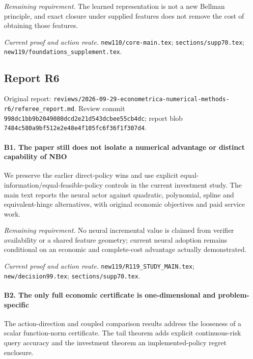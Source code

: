 \par\emph{Remaining requirement.} The learned representation is not a new Bellman principle, and exact closure under supplied features does not remove the cost of obtaining those features.

\par\emph{Current proof and action route.} \nolinkurl{new110/core-main.tex}; \nolinkurl{sections/supp70.tex}; \nolinkurl{new119/foundations_supplement.tex}.

\subsection{Report R6}

Original report: \nolinkurl{reviews/2026-09-29-econometrica-numerical-methods-r6/referee_report.md}. Review commit \nolinkurl{998dc1bb9b2049080dcd2e21d543dcbee55cb4dc}; report blob \nolinkurl{7484c580a9bf512e2e48e4f105fc6f36f1f307d4}.

\paragraph{B1. The paper still does not isolate a numerical advantage or distinct capability of NBO}

We preserve the earlier direct-policy wins and use explicit equal-information/\allowbreak{}equal-feasible-policy controls in the current investment study. The main text reports the neural actor against quadratic, polynomial, spline and equivalent-hinge alternatives, with original economic objectives and paid service work.

\par\emph{Remaining requirement.} No neural incremental value is claimed from verifier availability or a shared feature geometry; current neural adoption remains conditional on an economic and complete-cost advantage actually demonstrated.

\par\emph{Current proof and action route.} \nolinkurl{new119/R119_STUDY_MAIN.tex}; \nolinkurl{new/decision99.tex}; \nolinkurl{sections/supp70.tex}.

\paragraph{B2. The only full economic certificate is one-dimensional and problem-specific}

The action-direction and coupled comparison results address the looseness of a scalar function-norm certificate. The tail theorem adds explicit continuous-risk query accuracy and the investment theorem an implemented-policy regret enclosure.

